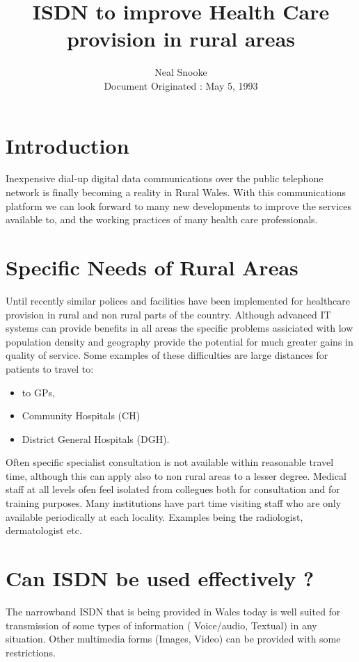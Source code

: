 \title{ISDN to improve Health Care provision in rural areas}
\author{Neal Snooke\\
 Document Originated : May 5, 1993}

\maketitle

\section{Introduction}
Inexpensive dial-up digital data communications over the public telephone
network is finally becoming a reality in Rural Wales.  With this 
communications platform
we can look forward to many new developments to improve the services 
available to, and the working practices of many health care professionals. 

\section{Specific Needs of Rural Areas}
Until recently similar polices and facilities have been implemented for
healthcare provision in rural and non rural parts of the country.  
Although advanced IT systems can provide benefits in all areas the 
specific problems assiciated with low population density and 
geography provide the potential for much greater gains in quality
of service.  Some examples of these difficulties are large distances for patients to travel to:
\begin{itemize}
\item to GPs, 
\item Community Hospitals (CH) 
\item District General Hospitals (DGH).  
\end{itemize}
Often specific specialist 
consultation is not available within reasonable travel time, although
this can apply also to non rural areas to a lesser degree.  
Medical staff at all levels ofen feel isolated from collegues both for
consultation and for training purposes.  Many institutions have
part time visiting staff who are only available periodically at
each locality.  Examples being the radiologist, dermatologist etc.
 
\section{Can ISDN be used effectively ?}

The narrowband ISDN that is being provided in Wales today is
well suited for transmission of some types of information (
Voice/audio, Textual) in any situation.  Other multimedia 
forms (Images, Video) can be provided with some restrictions. 
 

